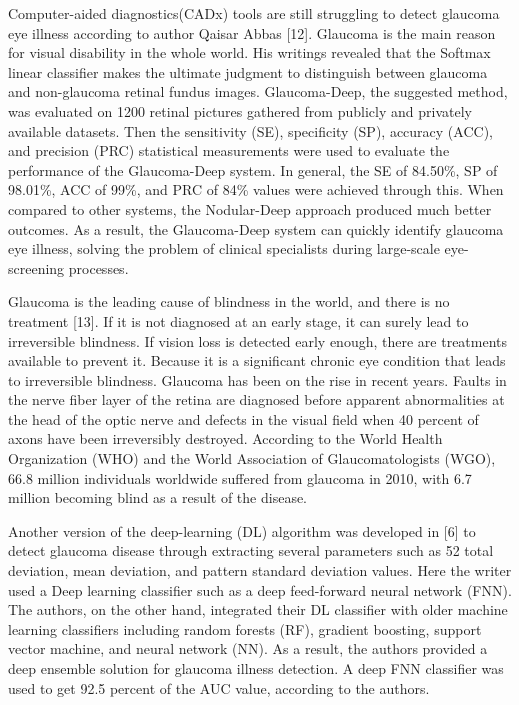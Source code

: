\vspace{5mm}
\noindent Computer-aided diagnostics(CADx) tools are still struggling to detect glaucoma eye illness according to author Qaisar Abbas [12]. Glaucoma is the main reason for visual disability in the whole world. His writings revealed that the Softmax linear classifier makes the ultimate judgment to distinguish between glaucoma and non-glaucoma retinal fundus images. Glaucoma-Deep, the suggested method, was evaluated on 1200 retinal pictures gathered from publicly and privately available datasets. Then the sensitivity (SE), specificity (SP), accuracy (ACC), and precision (PRC) statistical measurements were used to evaluate the performance of the Glaucoma-Deep system. In general, the SE of 84.50\%, SP of 98.01\%, ACC of 99\%, and PRC of 84\% values were achieved through this. When compared to other systems, the Nodular-Deep approach produced much better outcomes. As a result, the Glaucoma-Deep system can quickly identify glaucoma eye illness, solving the problem of clinical specialists during large-scale eye-screening processes.

\vspace{5mm}
\noindent Glaucoma is the leading cause of blindness in the world, and there is no treatment [13]. If it is not diagnosed at an early stage, it can surely lead to irreversible blindness. If vision loss is detected early enough, there are treatments available to prevent it. Because it is a significant chronic eye condition that leads to irreversible blindness. Glaucoma has been on the rise in recent years. Faults in the nerve fiber layer of the retina are diagnosed before apparent abnormalities at the head of the optic nerve and defects in the visual field when 40 percent of axons have been irreversibly destroyed. According to the World Health Organization (WHO) and the World Association of Glaucomatologists (WGO), 66.8 million individuals worldwide suffered from glaucoma in 2010, with 6.7 million becoming blind as a result of the disease.

\vspace{5mm}
\noindent Another version of the deep-learning (DL) algorithm was developed in [6] to detect glaucoma disease through extracting several parameters such as 52 total deviation, mean deviation, and pattern standard deviation values. Here the writer used a Deep learning classifier such as a deep feed-forward neural network (FNN). The authors, on the other hand, integrated their DL classifier with older machine learning classifiers including random forests (RF), gradient boosting, support vector machine, and neural network (NN). As a result, the authors provided a deep ensemble solution for glaucoma illness detection. A deep FNN classifier was used to get 92.5 percent of the AUC value, according to the authors.

